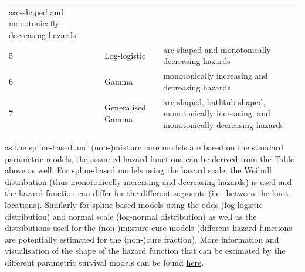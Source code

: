 \documentclass[]{article}
\begin{document}
\begin{longtable}[]{@{}lll@{}}
\begin{minipage}[t]{0.22\columnwidth}
arc-shaped and monotonically decreasing hazards\strut
\end{minipage}\tabularnewline
\begin{minipage}[t]{0.04\columnwidth}\raggedright\strut
5\strut
\end{minipage} & \begin{minipage}[t]{0.22\columnwidth}\raggedright\strut
Log-logistic\strut
\end{minipage} & \begin{minipage}[t]{0.22\columnwidth}\raggedright\strut
arc-shaped and monotonically decreasing hazards\strut
\end{minipage}\tabularnewline
\begin{minipage}[t]{0.04\columnwidth}\raggedright\strut
6\strut
\end{minipage} & \begin{minipage}[t]{0.22\columnwidth}\raggedright\strut
Gamma\strut
\end{minipage} & \begin{minipage}[t]{0.22\columnwidth}\raggedright\strut
monotonically increasing and decreasing hazards\strut
\end{minipage}\tabularnewline
\begin{minipage}[t]{0.04\columnwidth}\raggedright\strut
7\strut
\end{minipage} & \begin{minipage}[t]{0.22\columnwidth}\raggedright\strut
Generalised Gamma\strut
\end{minipage} & \begin{minipage}[t]{0.22\columnwidth}\raggedright\strut
arc-shaped, bathtub-shaped, monotonically increasing, and monotonically
decreasing hazards\strut
\end{minipage}\tabularnewline
\bottomrule
\end{longtable}

as the spline-based and (non-)mixture cure models are based on the
standard parametric models, the assumed hazard functions can be derived
from the Table above as well. For spline-based models using the hazard
scale, the Weibull distribution (thus monotonically increasing and
decreasing hazards) is used and the hazard function can differ for the
different segments (i.e.~between the knot locations). Similarly for
spline-based models using the odds (log-logistic distribution) and
normal scale (log-normal distribution) as well as the distributions used
for the (non-)mixture cure models (different hazard functions are
potentially estimated for the (non-)cure fraction). More information and
visualisation of the shape of the hazard function that can be estimated
by the different parametric survival models can be found
\href{https://devinincerti.com/2019/06/18/parametric_survival.html}{here}.
\end{document}
